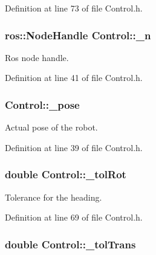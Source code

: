 Definition at line 73 of file Control.\-h.

\hypertarget{classControl_a535634dd1aa6331c1da87a3da4800fac}{
\subsubsection[{\-\_\-n}]{\setlength{\rightskip}{0pt plus 5cm}ros\-::\-Node\-Handle Control\-::\-\_\-n\hspace{0.3cm}{\ttfamily [private]}}}\label{classControl_a535634dd1aa6331c1da87a3da4800fac}


Ros node handle. 



Definition at line 41 of file Control.\-h.

\hypertarget{classControl_a5aaf886a6c03a01a66b1d692ee0194ae}{
\subsubsection[{\-\_\-pose}]{ Control\-::\-\_\-pose\hspace{0.3cm}{\ttfamily [private]}}}\label{classControl_a5aaf886a6c03a01a66b1d692ee0194ae}


Actual pose of the robot. 



Definition at line 39 of file Control.\-h.

\hypertarget{classControl_ae76716c78a0337c965ff496f9e0ae1fd}{
\subsubsection[{\-\_\-tol\-Rot}]{\setlength{\rightskip}{0pt plus 5cm}double Control\-::\-\_\-tol\-Rot\hspace{0.3cm}{\ttfamily [private]}}}\label{classControl_ae76716c78a0337c965ff496f9e0ae1fd}


Tolerance for the heading. 



Definition at line 69 of file Control.\-h.

\hypertarget{classControl_a1807356ca5230aca9ccb77bf869f007a}{
\subsubsection[{\-\_\-tol\-Trans}]{\setlength{\rightskip}{0pt plus 5cm}double Control\-::\-\_\-tol\-Trans\hspace{0.3cm}{\ttfamily [private]}}}\label{classControl_a1807356ca5230aca9ccb77bf869f007a}


